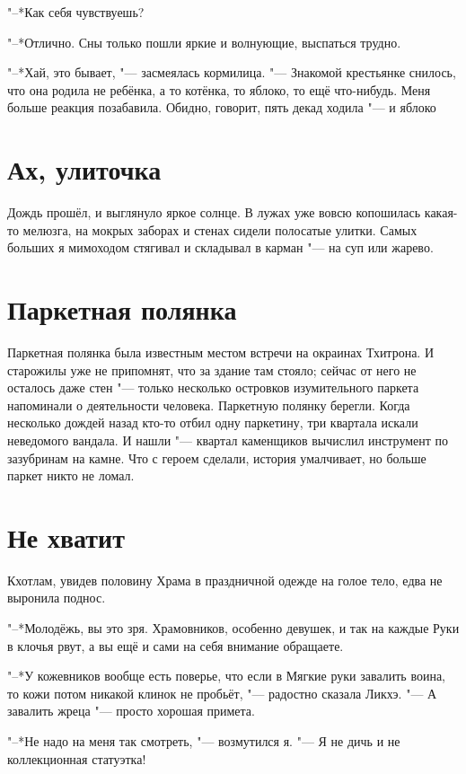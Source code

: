 \documentclass[a4paper,10pt]{book}
\newcommand{\ldotst}{\so{...}\xspace}
\begin{document}
"--*Как себя чувствуешь?

"--*Отлично. Сны только пошли яркие и волнующие, выспаться трудно.

"--*Хай, это бывает, "--- засмеялась кормилица. "--- Знакомой крестьянке снилось, что она родила не ребёнка, а то котёнка, то яблоко, то ещё что-нибудь.
Меня больше реакция позабавила. Обидно, говорит, пять декад ходила "--- и яблоко\ldotst
 
 \section{Ах, улиточка}

 Дождь прошёл, и выглянуло яркое солнце. В лужах уже вовсю копошилась какая-то мелюзга, на мокрых заборах и стенах сидели полосатые улитки. Самых больших я мимоходом стягивал и складывал в карман "--- на суп или жарево.
 
\section{Паркетная полянка}
 
Паркетная полянка была известным местом встречи на окраинах Тхитрона. И старожилы уже не припомнят, что за здание там стояло; сейчас от него не осталось даже стен "--- только несколько островков изумительного паркета напоминали о деятельности человека. Паркетную полянку берегли. Когда несколько дождей назад кто-то отбил одну паркетину, три квартала
искали неведомого вандала. И нашли "--- квартал каменщиков вычислил инструмент по зазубринам на камне. Что с героем сделали, история умалчивает, но больше паркет никто не ломал.

 \section{Не хватит}

 Кхотлам, увидев половину Храма в праздничной одежде на голое тело, едва не выронила поднос.

"--*Молодёжь, вы это зря. Храмовников, особенно девушек, и так на каждые Руки в клочья рвут, а вы ещё и сами на себя внимание обращаете.

"--*У кожевников вообще есть поверье, что если в Мягкие руки завалить воина, то кожи потом никакой клинок не пробьёт, "--- радостно сказала Ликхэ. "--- А завалить жреца "--- просто хорошая примета.

"--*Не надо на меня так смотреть, "--- возмутился я. "--- Я не дичь и не коллекционная статуэтка!
\end{document}
